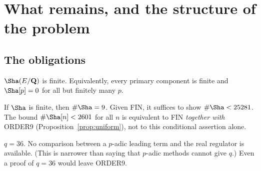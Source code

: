 \section{What remains, and the structure of the problem}\label{sec:remaining}

\subsection{The obligations}
\begin{obligation}
$\Sha(E/\Q)$ is finite. Equivalently, every primary component is finite and $\Sha[p]=0$ for all but finitely many $p$.
\end{obligation}
\begin{obligation}
If $\Sha$ is finite, then $\#\Sha=9$. Given FIN, it suffices to show $\#\Sha<25281$. The bound $\#\Sha[n]<2601$ for all $n$ is equivalent to FIN \emph{together with} ORDER9 (Proposition~\ref{prop:uniform}), not to this conditional assertion alone.
\end{obligation}
\begin{obligation}[\cid{O.3}, Q36]
$q=36$. No comparison between a $p$-adic leading term and the real regulator is available. (This is narrower than saying that $p$-adic methods cannot give $q$.) Even a proof of $q=36$ would leave ORDER9.
\end{obligation}

